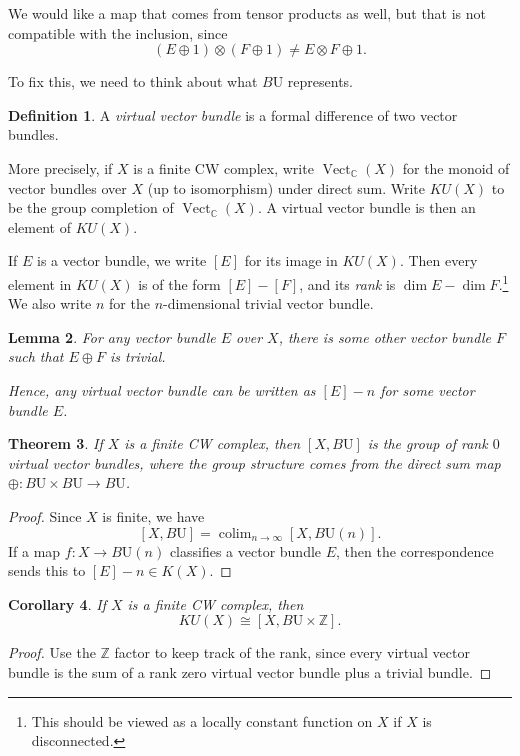 \documentclass{shortart}
\newtheorem{thm}{Theorem}
\newtheorem{lemma}[thm]{Lemma}
\newtheorem{cor}[thm]{Corollary}
\theoremstyle{definition}
\newtheorem{defi}[thm]{Definition}
\newcommand\BU{B\mathrm{U}}
\newcommand\Z{\mathbb{Z}}
\newcommand\C{\mathbb{C}}
\DeclareMathOperator*\colim{colim}
\DeclareMathOperator\Vect{Vect}
\begin{document}
We would like a map that comes from tensor products as well, but that is not compatible with the inclusion, since
\[
  (E \oplus 1) \otimes (F \oplus 1) \neq E \otimes F \oplus 1.
\]

To fix this, we need to think about what $\BU$ represents.
\begin{defi}
  A \emph{virtual vector bundle} is a formal difference of two vector bundles.
  
  More precisely, if $X$ is a finite CW complex, write $\Vect_\C(X)$ for the monoid of vector bundles over $X$ (up to isomorphism) under direct sum. Write $KU(X)$ to be the group completion of $\Vect_\C(X)$. A virtual vector bundle is then an element of $KU(X)$.
\end{defi}
If $E$ is a vector bundle, we write $[E]$ for its image in $KU(X)$. Then every element in $KU(X)$ is of the form $[E] - [F]$, and its \emph{rank} is $\dim E - \dim F$.\footnote{This should be viewed as a locally constant function on $X$ if $X$ is disconnected.} We also write $n$ for the $n$-dimensional trivial vector bundle.

\begin{lemma}
  For any vector bundle $E$ over $X$, there is some other vector bundle $F$ such that $E \oplus F$ is trivial.

  Hence, any virtual vector bundle can be written as $[E] - n$ for some vector bundle $E$.\fakeqed
\end{lemma}

\begin{thm}
  If $X$ is a finite CW complex, then $[X, \BU]$ is the group of rank $0$ virtual vector bundles, where the group structure comes from the direct sum map $\oplus: \BU \times \BU \to \BU$.
\end{thm}

\begin{proof}
  Since $X$ is finite, we have
  \[
    [X, \BU] = \colim_{n \to \infty} [X, \BU(n)].
  \]
  If a map $f: X \to \BU(n)$ classifies a vector bundle $E$, then the correspondence sends this to $[E] - n \in K(X)$.
\end{proof}

\begin{cor}
  If $X$ is a finite CW complex, then
  \[
    KU(X) \cong [X, \BU \times \Z].
  \]
\end{cor}

\begin{proof}
  Use the $\Z$ factor to keep track of the rank, since every virtual vector bundle is the sum of a rank zero virtual vector bundle plus a trivial bundle.
\end{proof}
\end{document}
